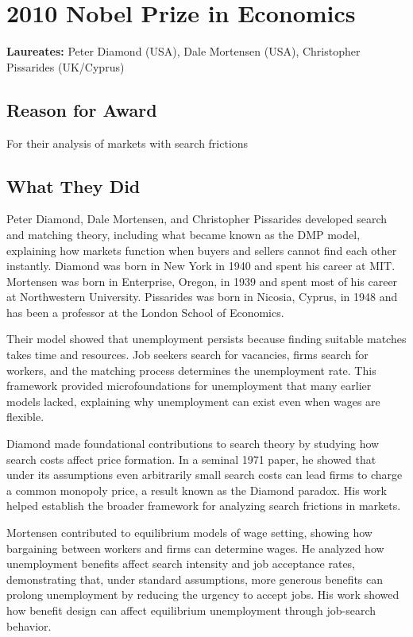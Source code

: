 \chapter{2010 Nobel Prize in Economics}
\textbf{Laureates: }Peter Diamond (USA), Dale Mortensen (USA), Christopher Pissarides (UK/Cyprus)

\section*{Reason for Award}
For their analysis of markets with search frictions

\section{What They Did}
Peter Diamond, Dale Mortensen, and Christopher Pissarides developed search and
matching theory, including what became known as the DMP model, explaining how
markets function when buyers and sellers cannot find each other instantly.
Diamond was born in New York in 1940 and spent his career at MIT. Mortensen was
born in Enterprise, Oregon, in 1939 and spent most of his career at Northwestern
University. Pissarides was born in Nicosia, Cyprus, in 1948 and has been a
professor at the London School of Economics.

Their model showed that unemployment persists because finding suitable matches
takes time and resources. Job seekers search for vacancies, firms search for
workers, and the matching process determines the unemployment rate. This
framework provided microfoundations for unemployment that many earlier models
lacked, explaining why unemployment can exist even when wages are flexible.

Diamond made foundational contributions to search theory by studying how search
costs affect price formation. In a seminal 1971 paper, he showed that under its
assumptions even arbitrarily small search costs can lead firms to charge a common
monopoly price, a result known as the Diamond paradox. His work helped establish
the broader framework for analyzing search frictions in markets.

Mortensen contributed to equilibrium models of wage setting, showing how
bargaining between workers and firms can determine wages. He analyzed how
unemployment benefits affect search intensity and job acceptance rates,
demonstrating that, under standard assumptions, more generous benefits can
prolong unemployment by reducing the urgency to accept jobs. His work showed how
benefit design can affect equilibrium unemployment through job-search behavior.

